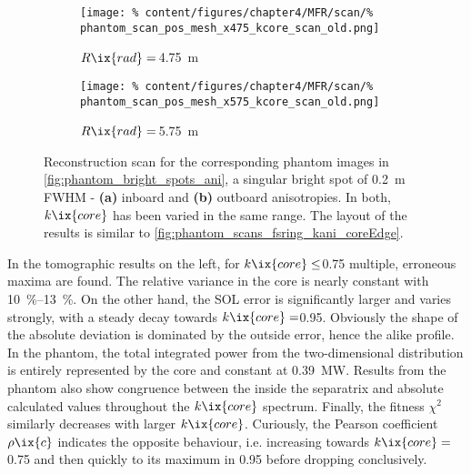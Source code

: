                 \begin{figure}%
                    \centering%
                    \begin{subfigure}{0.45\textwidth}%
                        \centering%
                        \texttt{[image: \%
                            content/figures/chapter4/MFR/scan/\%
                            phantom\_scan\_pos\_mesh\_x475\_kcore\_scan\_old.png]}%
                        \caption{%
                            $R\ix{rad}=\,$\SI{4.75}{\meter}}%
                    \end{subfigure}%
                    \hfill%
                    \begin{subfigure}{0.45\textwidth}%
                        \centering%
                        \texttt{[image: \%
                            content/figures/chapter4/MFR/scan/\%
                            phantom\_scan\_pos\_mesh\_x575\_kcore\_scan\_old.png]}%
                        \caption{%
                            $R\ix{rad}=\,$\SI{5.75}{\meter}}%
                    \end{subfigure}%
                    \caption{Reconstruction scan for the corresponding phantom images in \cref{fig:phantom_bright_spots_ani}, a singular bright spot of \SI{0.2}{\meter} FWHM -  \textbf{(a)} inboard and \textbf{(b)} outboard anisotropies. In both, $k\ix{core}$ has been varied in the same range. The layout of the results is similar to \cref{fig:phantom_scans_fsring_kani_coreEdge}.}\label{fig:phantom_scans_xx75_kani_core}%
                \end{figure}%
%
                In the tomographic results on the left, for $k\ix{core}\le$\SI{0.75}{\arbitraryunit} multiple, erroneous maxima are found. The relative variance in the core is nearly constant with \SIrange{10}{13}{\percent}. On the other hand, the SOL error is significantly larger and varies strongly, with a steady decay towards $k\ix{core}=$\SI{0.95}{\arbitraryunit}. Obviously the shape of the absolute deviation is dominated by the outside error, hence the alike profile. In the phantom, the total integrated power from the two-dimensional distribution is entirely represented by the core and constant at \SI{0.39}{\mega\watt}. Results from the phantom also show congruence between the inside the separatrix and absolute calculated values throughout the $k\ix{core}$ spectrum. Finally, the fitness $\chi^{2}$ similarly decreases with larger $k\ix{core}$. Curiously, the Pearson coefficient $\rho\ix{c}$ indicates the opposite behaviour, i.e. increasing towards $k\ix{core}=$\SI{0.75}{\arbitraryunit} and then quickly to its maximum in \SI{0.95}{\arbitraryunit} before dropping conclusively.\\%
